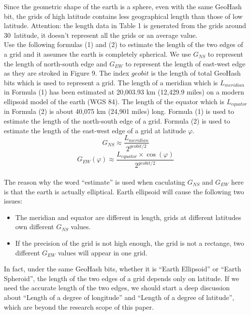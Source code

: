 \documentclass[sigplan,screen]{acmart}
\begin{document}
Since the geometric shape of the earth is a sphere, even with the same GeoHash bit, the grids of high latitude contains less geographical length than those of low latitude.
Attention: the length data in Table 1 is generated from the grids around 30\degree\ latitude, it doesn't represent all the grids or an average value.
\\
Use the following formulas (1) and (2) to estimate the length of the two edges of a grid and it assumes the earth is completely spherical.
We use $G_{NS}$ to represent the length of north-south edge and $G_{EW}$ to represent the length of east-west edge as they are stroked in Figure 9.
The index $geobit$ is the length of total GeoHash bits which is used to represent a grid.
The length of a meridian which is $L_{meridian}$ in Formula (1) has been estimated at 20,003.93 km (12,429.9 miles) on a modern ellipsoid model of the earth (WGS 84)\cite{weintrit2013so}.
The length of the equator which is $L_{equator}$ in Formula (2) is about 40,075 km (24,901 miles) long\cite{equator2011}.
Formula (1) is used to estimate the length of the north-south edge of a grid.
Formula (2) is used to estimate the length of the east-west edge of a grid at latitude $\varphi$.
\begin{equation}
	G_{NS}\approx\frac{L_{meridian}}{2^{geobit/2}}
\end{equation}
\begin{equation}
	G_{EW}(\varphi)\approx\frac{L_{equator}\times\cos(\varphi)}{2^{geobit/2}}
\end{equation}
\\
The reason why the word ``estimate'' is used when caculating $G_{NS}$ and $G_{EW}$ here is that the earth is actually elliptical.
Earth ellipsoid will cause the following two issues:
\begin{itemize}
	\item The meridian and equator are different in length, grids at different latitudes own different $G_{NS}$ values.
	\item If the precision of the grid is not high enough, the grid is not a rectange, two different $G_{EW}$ values will appear in one grid.
\end{itemize}
In fact, under the same GeoHash bits, whether it is ``Earth Ellipsoid'' or ``Earth Spheroid'', the length of the two edges of a grid depends only on latitude.
If we need the accurate length of the two edges, we should start a deep discussion about ``Length of a degree of longitude'' and ``Length of a degree of latitude'', which are beyond the research scope of this paper.
\end{document}
